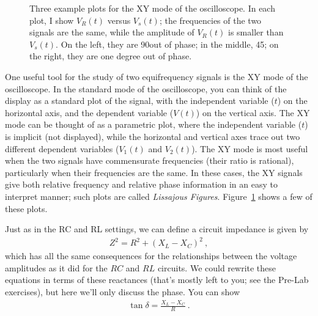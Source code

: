 \documentclass[12pt]{article}
\begin{document}
\begin{figure}
  \centering
  \caption{Three example plots for the XY mode of the oscilloscope.
    In each plot, I show $V_R(t)$ versus $V_s(t)$; the frequencies of
    the two signals are the same, while the amplitude of $V_R(t)$ is
    smaller than $V_s(t)$.  On the left, they are 90\textdegree out of
    phase; in the middle, 45\textdegree; on the right, they are one
    degree out of phase.}
  \label{fig:lissajous}
\end{figure}
One useful tool for the study of two equifrequency signals is the XY
mode of the oscilloscope.  In the standard mode of the oscilloscope,
you can think of the display as a standard plot of the signal, with
the independent variable ($t$) on the horizontal axis, and the
dependent variable ($V(t)$) on the vertical axis.  The XY mode can be
thought of as a parametric plot, where the independent variable ($t$)
is implicit (not displayed), while the horizontal and vertical axes
trace out two different dependent variables ($V_1(t)$ and $V_2(t)$).
The XY mode is most useful when the two signals have commensurate
frequencies (their ratio is rational), particularly when their
frequencies are the same.  In these cases, the XY signals give both
relative frequency and relative phase information in an easy to
interpret manner; such plots are called \textit{Lissajous
  Figures}. Figure~\ref{fig:lissajous} shows a few of these plots.

Just as in the RC and RL settings, we can define a circuit impedance
is given by
\begin{gather*}
  Z^2 = R^2 + \left(X_L-X_C\right)^2\ ,
\end{gather*}
which has all the same consequences for the relationships between
the voltage amplitudes as it did for the $RC$ and $RL$ circuits.  We
could rewrite these equations in terms of these reactances (that's
mostly left to you; see the Pre-Lab exercises), but here we'll only
discuss the phase.  You can show
\begin{gather*}
  \tan \delta = \frac{X_L - X_C}{R}\ .
\end{gather*}
\end{document}
